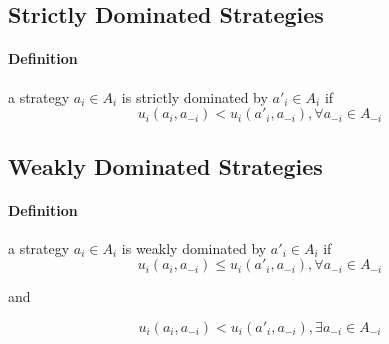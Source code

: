 \subsection{Strictly Dominated Strategies}
\paragraph{Definition}a strategy $a_i \in A_i $ is strictly dominated by $a'_i \in A_i$ if
\begin{equation} u_i(a_i, a_{-i}) < u_i(a'_i, a_{-i}) ,  \forall   a_{-i} \in A_{-i} \end{equation}

\subsection{Weakly Dominated Strategies}
\paragraph{Definition}a strategy $a_i \in A_i $ is weakly dominated by $a'_i \in A_i$ if
\begin{equation} u_i(a_i, a_{-i}) \leq u_i(a'_i, a_{-i}) ,  \forall   a_{-i} \in A_{-i} \end{equation}
\begin{center}
and 
\end{center}
\begin{equation} u_i(a_i, a_{-i}) < u_i(a'_i, a_{-i}) ,\exists   a_{-i} \in A_{-i} \end{equation} 

